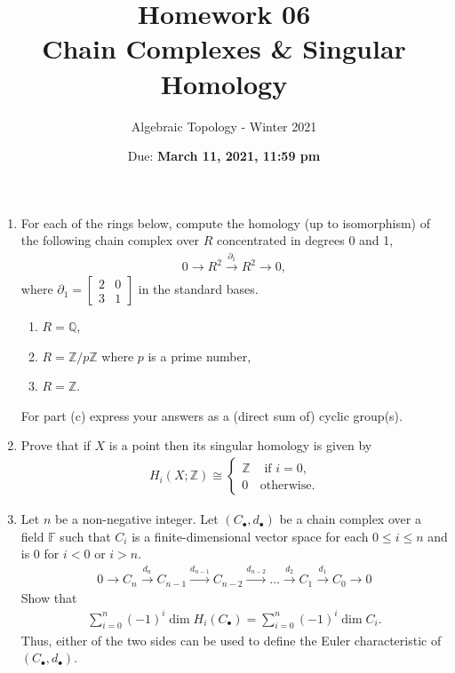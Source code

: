 \documentclass{article}
\title{Homework 06 \\ Chain Complexes \& Singular Homology}
\author{Algebraic Topology - Winter 2021}
\date{Due: \textbf{March 11, 2021, 11:59 pm}}
\begin{document}
\maketitle

\begin{enumerate}
    \item For each of the rings below, compute the homology (up to isomorphism) of the following chain complex over $R$ concentrated in degrees 0 and 1,
    \begin{align*}
        0 \to R^2 \overset{\partial_1}{\longrightarrow} R^2 \to 0,
    \end{align*}
    where $\partial_1 = \begin{bmatrix} 2 & 0 \\ 3 & 1\end{bmatrix}$ in the standard bases.
    \begin{enumerate}
        \item $ R = \mathbb{Q}$,
        \item $ R = \mathbb{Z}/p \mathbb{Z}$ where $p$ is a prime number,
        \item $ R = \mathbb{Z}$.
    \end{enumerate}
    For part (c) express your answers as a (direct sum of) cyclic group(s).
    \item Prove that if $X$ is a point then its singular homology is given by
    \begin{align*}
        H_i(X; \mathbb{Z}) \cong 
        \begin{cases}
        \mathbb{Z} & \mbox{ if } i = 0, \\
        0 & \mbox{otherwise.}
        \end{cases}
    \end{align*}
    
    \item Let $n$ be a non-negative integer. Let $(C_\bullet, d_\bullet)$ be a chain complex over a field $\mathbb{F}$ such that $C_i$ is a finite-dimensional vector space for each $ 0 \le i \le n$ and is 0 for $ i < 0$ or $i > n$. 
    \begin{align*}
        0 \to C_n \overset{d_n}{\longrightarrow} C_{n-1}
        \overset{d_{n-1}}{\longrightarrow} C_{n-2}
        \overset{d_{n-2}}{\longrightarrow} 
        \dots
        \overset{d_{2}}{\longrightarrow} C_1
        \overset{d_{1}}{\longrightarrow} C_0
        \to 0
    \end{align*}
    Show that 
    \begin{align*}
        \sum \limits_{i=0}^n (-1)^i\dim H_i (C_\bullet) =        
        \sum \limits_{i=0}^n (-1)^i\dim C_i.
    \end{align*}
    Thus, either of the two sides can be used to define the Euler characteristic of $(C_\bullet, d_\bullet)$.
    

\end{enumerate}
\end{document}
